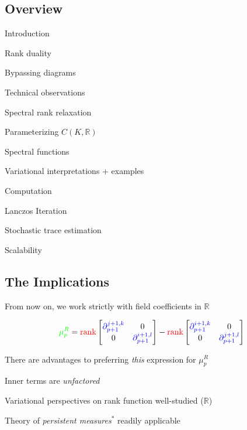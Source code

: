 \documentclass[
  letterpaper,
  DIV=11,
  numbers=noendperiod,
  oneside]{scrartcl}
\begin{document}
\subsection{Overview}\label{overview}

Introduction

Rank duality

Bypassing diagrams

Technical observations

Spectral rank relaxation

Parameterizing \(C(K, \mathbb{R})\)

Spectral functions

Variational interpretations + examples

Computation

Lanczos Iteration

Stochastic trace estimation

Scalability

\subsection{The Implications}\label{the-implications}

From now on, we work strictly with field coefficients in \(\mathbb{R}\)

\[
    {\color{green} \mu_p^{R}} = 
    {\color{red} \mathrm{rank}}\begin{bmatrix} {\color{blue} \partial_{p+1}^{j + 1, k}} & 0 \\
    0 & {\color{blue} \partial_{p+1}^{i + 1, l} }
    \end{bmatrix}
    - 
    {\color{red} \mathrm{rank}}\begin{bmatrix} {\color{blue} \partial_{p+1}^{i + 1, k}} & 0 \\
    0 & {\color{blue} \partial_{p+1}^{j + 1, l} }
    \end{bmatrix}
\]

There are advantages to preferring \emph{this} expression for
\(\mu_p^R\)

{ Inner terms } are \emph{unfactored}

Variational perspectives on {rank function } well-studied
(\(\mathbb{R}\))

Theory of {\emph{persistent measures}\(^{\ast}\)} readily applicable

\end{document}
